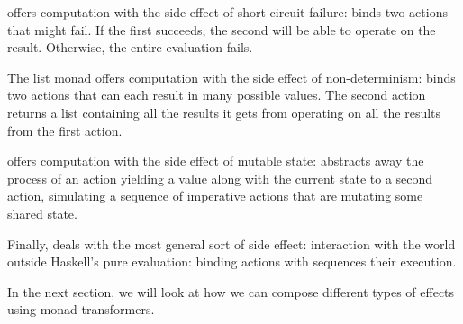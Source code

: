 \begin{notelist}
    \item {} offers computation with the side effect of short-circuit failure: \code{(>>=)} binds
          two actions that might fail. If the first succeeds, the second will be able to operate on the result.
          Otherwise, the entire evaluation fails.
    \item The list monad offers computation with the side effect of non-determinism: \code{(>>=)} binds two
          actions that can each result in many possible values. The second action returns a list containing
          all the results it gets from operating on all the results from the first action.
    \item {} offers computation with the side effect of mutable state: \code{(>>=)} abstracts away
          the process of an action yielding a value along with the current state to a second action,
          simulating a sequence of imperative actions that are mutating some shared state.
    \item Finally,  deals with the most general sort of side effect: interaction with the world outside
          Haskell's pure evaluation: binding  actions with \code{(>>=)} sequences their execution.
\end{notelist}
     
In the next section, we will look at how we can compose different types of effects using monad transformers.
